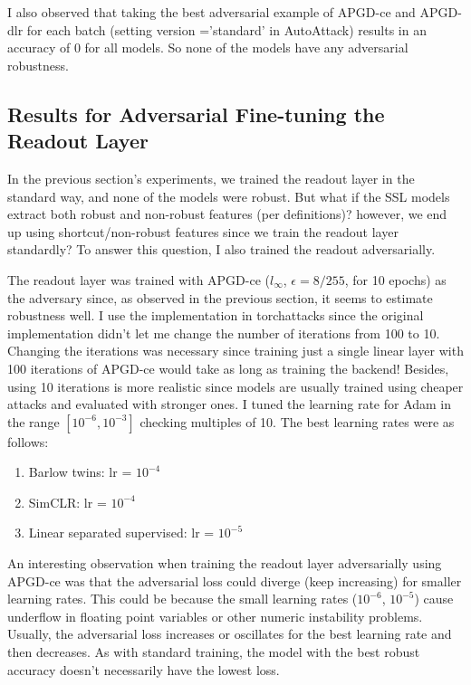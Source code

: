 \documentclass[../thesis.tex]{subfiles}
\begin{document}
	I also observed that taking the best adversarial example of APGD-ce and APGD-dlr for each batch (setting version ='standard' in AutoAttack) results in an accuracy of 0 for all models. So none of the models have any adversarial robustness. 
	
	
	\subsection{Results for Adversarial Fine-tuning the Readout Layer}
	\label{linear_adv_evals}
	
	In the previous section's experiments, we trained the readout layer in the standard way, and none of the models were robust. But what if the SSL models extract both robust and non-robust features (per \cite{features_not_bugs_madry} definitions)? however, we end up using shortcut/non-robust features since we train the readout layer standardly? To answer this question, I also trained the readout adversarially. 
	
	The readout layer was trained with APGD-ce ($l_{\infty}$, $\epsilon = 8/255$, for 10 epochs) as the adversary since, as observed in the previous section, it seems to estimate robustness well. I use the implementation in torchattacks since the original implementation didn't let me change the number of iterations from 100 to 10. Changing the iterations was necessary since training just a single linear layer with 100 iterations of APGD-ce would take as long as training the backend! Besides, using 10 iterations is more realistic since models are usually trained using cheaper attacks and evaluated with stronger ones. I tuned the learning rate for Adam in the range $[10^{-6}, 10^{-3} ]$ checking multiples of 10. 
	The best learning rates were as follows:
	
	\begin{enumerate}
		\item Barlow twins: lr = $10^{-4}$ %
		\item SimCLR: lr = $10^{-4}$   %
		\item Linear separated supervised: lr = $10^{-5}$ %
	\end{enumerate}
	
	An interesting observation when training the readout layer adversarially using APGD-ce was that the adversarial loss could diverge (keep increasing) for smaller learning rates. This could be because the small learning rates ($10^{-6}$, $10^{-5}$) cause underflow in floating point variables or other numeric instability problems. Usually, the adversarial loss increases or oscillates for the best learning rate and then decreases.    
	As with standard training, the model with the best robust accuracy doesn't necessarily have the lowest loss. 
	
\end{document}
